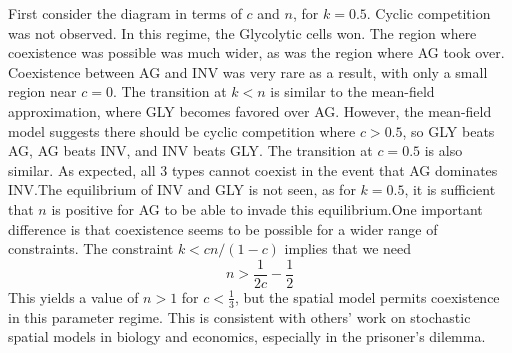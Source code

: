 \documentclass[12pt]{report}
\begin{document}
 First consider the diagram in terms of $c$ and $n$, for $k = 0.5$. Cyclic competition was not observed. In this regime, the Glycolytic cells won. The region where coexistence was possible was much wider, as was the region where AG took over. Coexistence between AG and INV was very rare as a result, with only a small region near $c = 0$. The transition at $k  < n$ is similar to the mean-field approximation, where GLY becomes favored over AG. However, the mean-field model suggests there should be cyclic competition where $c > 0.5$, so GLY beats AG, AG beats INV, and INV beats GLY. The transition at $c = 0.5$ is also similar. As expected, all 3 types cannot coexist in the event that AG dominates INV.The equilibrium of INV and GLY is not seen, as for $k = 0.5$, it is sufficient that $n$ is positive for AG to be able to invade this equilibrium.One important difference is that coexistence seems to be possible for a wider range of constraints. The constraint $k < cn / (1-c)$ implies that we need 
$$n > \frac{1}{2c} - \frac{1}{2}$$
This yields a value of $n > 1$ for $c < \frac{1}{3}$, but the spatial model permits coexistence in this parameter regime. This is consistent with others' work on stochastic spatial models in biology and economics, especially in the prisoner's dilemma\cite{Durrett2009}. 
\end{document}
